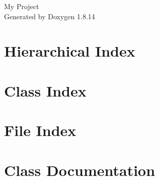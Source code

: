 \documentclass[twoside]{book}
\newcommand{\+}{\discretionary{\mbox{\scriptsize$\hookleftarrow$}}{}{}}
\newcommand{\clearemptydoublepage}{%
  \newpage{\pagestyle{empty}\cleardoublepage}%
}
\begin{document}
\hypersetup{pageanchor=false,
             bookmarksnumbered=true,
             pdfencoding=unicode
            }
\begin{titlepage}
\vspace*{7cm}
\begin{center}%
{\Large My Project }\\
\vspace*{1cm}
{\large Generated by Doxygen 1.8.14}\\
\end{center}
\end{titlepage}
\clearemptydoublepage
{}
\tableofcontents
\clearemptydoublepage
{}
\hypersetup{pageanchor=true}

\chapter{Hierarchical Index}

\chapter{Class Index}

\chapter{File Index}

\chapter{Class Documentation}





























\end{document}
